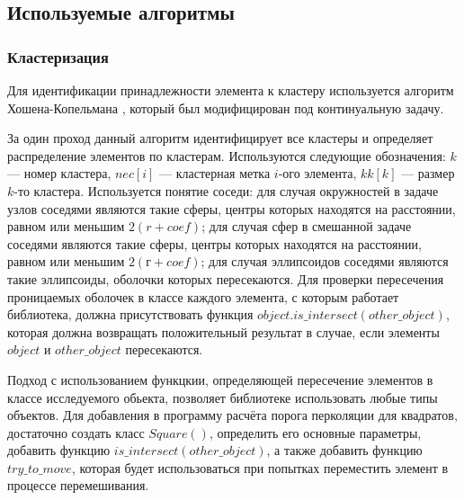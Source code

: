 \subsection{Используемые алгоритмы}

\subsubsection{Кластеризация}

Для идентификации принадлежности элемента к кластеру используется алгоритм Хошена-Копельмана \cite{hoshen}, который был модифицирован под континуальную задачу. 

За один проход данный алгоритм идентифицирует все кластеры и определяет распределение элементов по кластерам. Используются следующие обозначения: $k$ — номер кластера, $nec[i]$ — кластерная метка $i$-ого элемента, $kk[k]$ — размер $k$-то кластера. Используется понятие соседи: для случая окружностей в задаче узлов соседями являются такие сферы, центры которых находятся на расстоянии, равном или меньшим $2(r + coef)$; для случая сфер в смешанной задаче соседями являются такие сферы, центры которых находятся на расстоянии, равном или меньшим $2 (г + coef)$; для случая эллипсоидов соседями являются такие эллипсоиды, оболочки которых пересекаются. Для проверки пересечения проницаемых оболочек в классе каждого элемента, с которым работает библиотека, должна присутствовать функция $object.is\_intersect(other\_object)$, которая должна возвращать положительный результат в случае, если элементы $object$ и $other\_object$ пересекаются. 

Подход с использованием функцкии, определяющей пересечение элементов в классе исследуемого обьекта, позволяет библиотеке использовать любые типы объектов. Для добавления в программу расчёта порога перколяции для квадратов, достаточно создать класс $Square()$, определить его основные параметры, добавить функцию $is\_intersect(other\_object)$, а также добавить функцию $try\_to\_move$, которая будет использоваться при попытках переместить элемент в процессе перемешивания.

